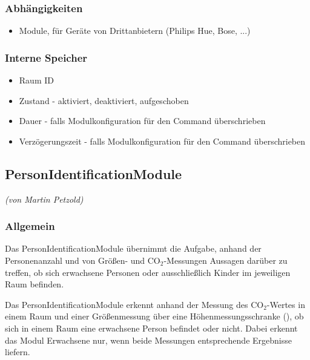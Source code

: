 \subsubsection{Abhängigkeiten}
\begin{itemize}
	\item Module, für Geräte von Drittanbietern (Philips Hue, Bose, ...)
\end{itemize}

\subsubsection{Interne Speicher}
\begin{itemize}
	\item Raum ID
	\item Zustand - aktiviert, deaktiviert, aufgeschoben
	\item Dauer - falls Modulkonfiguration für den Command überschrieben
	\item Verzögerungszeit - falls Modulkonfiguration für den Command überschrieben
	
\end{itemize}


\subsection{PersonIdentificationModule}
\emph{(von Martin Petzold)}

\subsubsection{Allgemein}
Das PersonIdentificationModule übernimmt die Aufgabe, anhand der Personenanzahl und von Größen- und CO$_2$-Messungen Aussagen darüber zu treffen, ob sich erwachsene Personen oder ausschließlich Kinder im  jeweiligen Raum befinden.

Das PersonIdentificationModule erkennt anhand der Messung des CO$_2$-Wertes in einem Raum und einer Größenmessung über eine Höhenmessungsschranke (), ob sich in einem Raum eine erwachsene Person befindet oder nicht. Dabei erkennt das Modul Erwachsene nur, wenn beide Messungen entsprechende Ergebnisse liefern.

